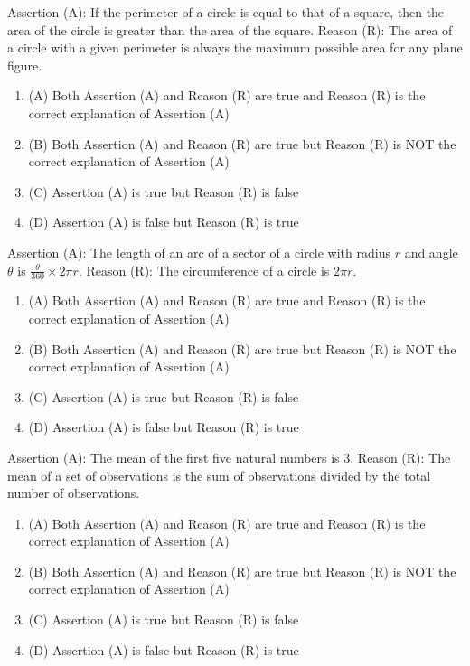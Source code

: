 \documentclass[12pt,a4paper]{exam}
\begin{document}
\begin{questions}
\question[1] Assertion (A): If the perimeter of a circle is equal to that of a square, then the area of the circle is greater than the area of the square. Reason (R): The area of a circle with a given perimeter is always the maximum possible area for any plane figure.
\begin{enumerate}[label=(\Alph*)]
  \item (A) Both Assertion (A) and Reason (R) are true and Reason (R) is the correct explanation of Assertion (A)
  \item (B) Both Assertion (A) and Reason (R) are true but Reason (R) is NOT the correct explanation of Assertion (A)
  \item (C) Assertion (A) is true but Reason (R) is false
  \item (D) Assertion (A) is false but Reason (R) is true
\end{enumerate}
\vspace{0.15cm}

\question[1] Assertion (A): The length of an arc of a sector of a circle with radius $r$ and angle $\theta$ is $\frac{\theta}{360} \times 2\pi r$. Reason (R): The circumference of a circle is $2\pi r$.
\begin{enumerate}[label=(\Alph*)]
  \item (A) Both Assertion (A) and Reason (R) are true and Reason (R) is the correct explanation of Assertion (A)
  \item (B) Both Assertion (A) and Reason (R) are true but Reason (R) is NOT the correct explanation of Assertion (A)
  \item (C) Assertion (A) is true but Reason (R) is false
  \item (D) Assertion (A) is false but Reason (R) is true
\end{enumerate}
\vspace{0.15cm}

\question[1] Assertion (A): The mean of the first five natural numbers is 3. Reason (R): The mean of a set of observations is the sum of observations divided by the total number of observations.
\begin{enumerate}[label=(\Alph*)]
  \item (A) Both Assertion (A) and Reason (R) are true and Reason (R) is the correct explanation of Assertion (A)
  \item (B) Both Assertion (A) and Reason (R) are true but Reason (R) is NOT the correct explanation of Assertion (A)
  \item (C) Assertion (A) is true but Reason (R) is false
  \item (D) Assertion (A) is false but Reason (R) is true
\end{enumerate}
\vspace{0.15cm}


\end{questions}
\end{document}

